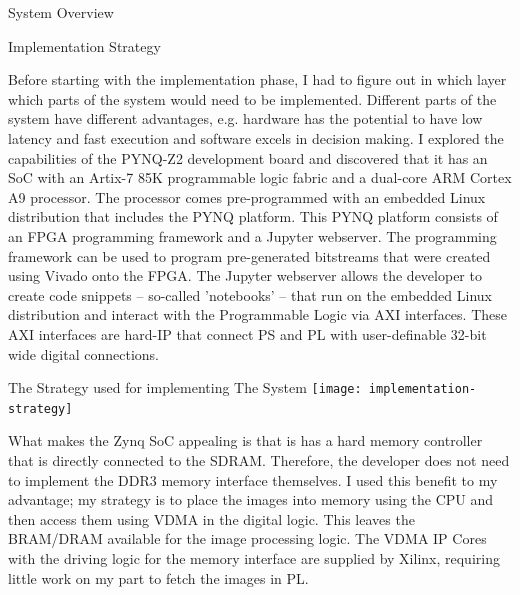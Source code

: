 \documentclass{matthijs}
\begin{document}
\begin{hoofdstuk}{System Overview}
		\begin{paragraaf}{Implementation Strategy}

			Before starting with the implementation phase, I had to figure out in which layer which parts of the system would need to be implemented.
			Different parts of the system have different advantages, e.g. hardware has the potential to have low latency and fast execution and software excels in decision making.
			I explored the capabilities of the PYNQ-Z2 development board and discovered that it has an SoC with an Artix-7 85K programmable logic fabric and a dual-core ARM Cortex A9 processor.
			The processor comes pre-programmed with an embedded Linux distribution that includes the PYNQ platform.
			This PYNQ platform consists of an FPGA programming framework and a Jupyter webserver.
			The programming framework can be used to program pre-generated bitstreams that were created using Vivado onto the FPGA.
			The Jupyter webserver allows the developer to create code snippets -- so-called 'notebooks' -- that run on the embedded Linux distribution and interact with the Programmable Logic via AXI interfaces.
			These AXI interfaces are hard-IP that connect PS and PL with user-definable 32-bit wide digital connections.
		
			\vspace{-0.6ex}
			\begin{figuur}{The Strategy used for implementing The System}
				\singlespacing
				\texttt{[image: implementation-strategy]}
				\onehalfspacing
			\end{figuur}
			\vspace{-0.2ex}

			What makes the Zynq SoC appealing is that is has a hard memory controller that is directly connected to the SDRAM.
			Therefore, the developer does not need to implement the DDR3 memory interface themselves.
			I used this benefit to my advantage; my strategy is to place the images into memory using the CPU and then access them using VDMA in the digital logic.
			This leaves the BRAM/DRAM available for the image processing logic.
			The VDMA IP Cores with the driving logic for the memory interface are supplied by Xilinx, requiring little work on my part to fetch the images in PL.
			
			\bigskip


\end{paragraaf}
\end{hoofdstuk}
\end{document}
